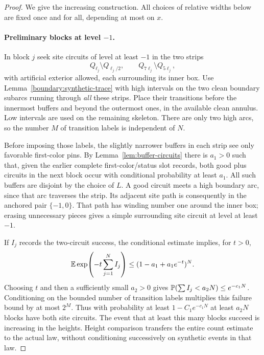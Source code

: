\begin{proof}
We give the increasing construction.  All choices of relative widths
below are fixed once and for all, depending at most on $x$.

\paragraph{Preliminary blocks at level $-1$.}
In block $j$ seek site circuits of level at least $-1$ in the two
strips
\[
 Q_{\ell_j}\setminus Q_{\ell_j/2},
 \qquad Q_{7\ell_j}\setminus Q_{5\ell_j},
\]
with artificial exterior allowed, each surrounding its inner box.
Use Lemma~\ref{boundary:synthetic-trace} with high intervals on the
two clean boundary subarcs running through \emph{all} these strips.
Place their transitions before the innermost buffers and beyond
the outermost ones, in the available clean annulus.  Low intervals
are used on the remaining skeleton.  There are only two high arcs,
so the number $M$ of transition labels is independent of $N$.

Before imposing those labels, the slightly narrower buffers in
each strip see only favorable first-color pins.  By
Lemma~\ref{lem:buffer-circuits} there is $a_1>0$ such that, given
the earlier complete first-color/status slot records, both good
plus circuits in the next block occur with conditional probability
at least $a_1$.  All such buffers are disjoint by the choice of $L$.
A good circuit meets a high boundary arc, since that arc traverses
the strip.  Its adjacent site path is consequently in the anchored
pair $\{-1,0\}$.  That path has winding number one around the inner
box; erasing unnecessary pieces gives a simple surrounding site
circuit at level at least $-1$.

If $I_j$ records the two-circuit success, the conditional estimate
implies, for $t>0$,
\[
 \mathbb E\exp\!\left(-t\sum_{j=1}^N I_j\right)
 \le(1-a_1+a_1e^{-t})^N.
\]
Choosing $t$ and then a sufficiently small $a_2>0$ gives
$\mathbb P(\sum I_j<a_2N)\le e^{-c_1N}$.
Conditioning on the bounded number of transition labels multiplies
this failure bound by at most $2^M$.  Thus with probability at least
$1-C_1e^{-c_1N}$ at least $a_2N$ blocks have both site circuits.
The event that at least this many blocks succeed is increasing in
the heights.  Height comparison transfers the entire count estimate
to the actual law, without conditioning successively on synthetic
events in that law.


\end{proof}
